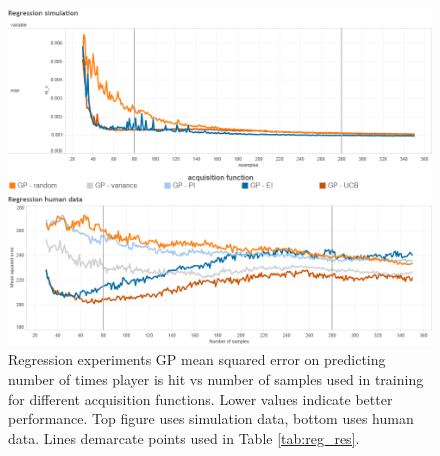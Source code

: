 \documentclass{sig-alternate}
\begin{document}


\begin{figure}[tb]
\centering
\includegraphics[width=\linewidth]{regression_results}
\caption{Regression experiments GP mean squared error on predicting number of times player is hit vs number of samples used in training for different acquisition functions. Lower values indicate better performance. Top figure uses simulation data, bottom uses human data. Lines demarcate points used in Table \ref{tab:reg_res}.}
\label{fig:reg_all}
\end{figure}
\end{document}
